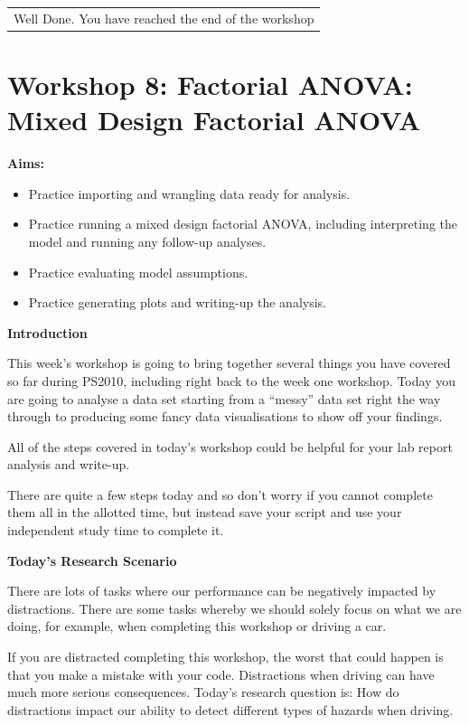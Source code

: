 \documentclass[
]{book}
\providecommand{\tightlist}{%
  \setlength{\itemsep}{0pt}\setlength{\parskip}{0pt}}
\begin{document}
\begin{longtable}[]{@{}l@{}}
\toprule\noalign{}
\endhead
\bottomrule\noalign{}
\endlastfoot
Well Done. You have reached the end of the workshop \\
\end{longtable}

\chapter{Workshop 8: Factorial ANOVA: Mixed Design Factorial ANOVA}\label{workshop-8-factorial-anova-mixed-design-factorial-anova}

\textbf{Aims:}

\begin{itemize}
\tightlist
\item
  Practice importing and wrangling data ready for analysis.
\item
  Practice running a mixed design factorial ANOVA, including interpreting the model and running any follow-up analyses.
\item
  Practice evaluating model assumptions.
\item
  Practice generating plots and writing-up the analysis.
\end{itemize}

\textbf{Introduction}

This week's workshop is going to bring together several things you have covered so far during PS2010, including right back to the week one workshop. Today you are going to analyse a data set starting from a ``messy'' data set right the way through to producing some fancy data visualisations to show off your findings.

All of the steps covered in today's workshop could be helpful for your lab report analysis and write-up.

There are quite a few steps today and so don't worry if you cannot complete them all in the allotted time, but instead save your script and use your independent study time to complete it.

\textbf{Today's Research Scenario}

There are lots of tasks where our performance can be negatively impacted by distractions. There are some tasks whereby we should solely focus on what we are doing, for example, when completing this workshop or driving a car.

If you are distracted completing this workshop, the worst that could happen is that you make a mistake with your code. Distractions when driving can have much more serious consequences. Today's research question is: How do distractions impact our ability to detect different types of hazards when driving.
\end{document}
